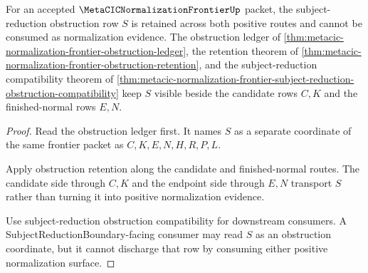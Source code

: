 \begin{theorem}
\label{thm:metacic-normalization-frontier-obligation-closure-obstruction-retention}
For an accepted $\MetaCICNormalizationFrontierUp$ packet, the subject-reduction obstruction row $S$ is retained across both positive routes and cannot be consumed as normalization evidence. The obstruction ledger of \autoref{thm:metacic-normalization-frontier-obstruction-ledger}, the retention theorem of \autoref{thm:metacic-normalization-frontier-obstruction-retention}, and the subject-reduction compatibility theorem of \autoref{thm:metacic-normalization-frontier-subject-reduction-obstruction-compatibility} keep $S$ visible beside the candidate rows $C,K$ and the finished-normal rows $E,N$.
\end{theorem}
\begin{proof}
Read the obstruction ledger first. It names $S$ as a separate coordinate of the same frontier packet as $C,K,E,N,H,R,P,L$.

Apply obstruction retention along the candidate and finished-normal routes. The candidate side through $C,K$ and the endpoint side through $E,N$ transport $S$ rather than turning it into positive normalization evidence.

Use subject-reduction obstruction compatibility for downstream consumers. A SubjectReductionBoundary-facing consumer may read $S$ as an obstruction coordinate, but it cannot discharge that row by consuming either positive normalization surface.
\end{proof}
